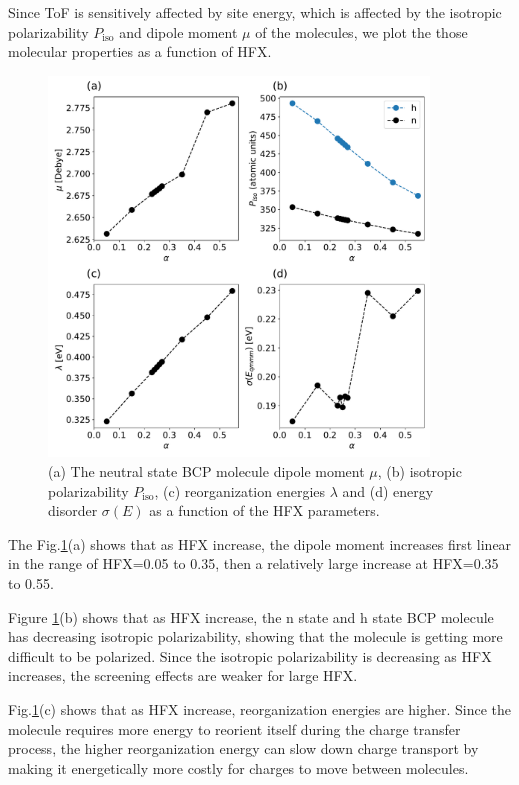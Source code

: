 \documentclass[letterpaper,12pt]{article}
\begin{document}
Since ToF is sensitively affected by site energy, which is affected by the isotropic polarizability $P_\text{iso}$ and dipole moment $\mu$ of the molecules, we plot the those molecular properties as a function of HFX. 
\begin{figure}[H]
    \centering
    \includegraphics[width=0.9\textwidth]{figs/BCP_HFX/fig_autogen_BCP.pdf}
    \caption{(a) The neutral state BCP molecule dipole moment $\mu$, (b) isotropic polarizability $P_\text{iso}$, (c) reorganization energies $\lambda$ and (d) energy disorder $\sigma(E)$ as a function of the HFX parameters. }
    \label{fig:autogen}
\end{figure}
The Fig.\ref{fig:autogen}(a) shows that as HFX increase, the dipole moment increases first linear in the range of HFX=0.05 to 0.35, then a relatively large increase at HFX=0.35 to 0.55.
 
Figure \ref{fig:autogen}(b) shows that as HFX increase, the n state and h state BCP molecule has decreasing isotropic polarizability, showing that the molecule is getting more difficult to be polarized. 
Since the isotropic polarizability is decreasing as HFX increases, the screening effects are weaker for large HFX. 

Fig.\ref{fig:autogen}(c) shows that as HFX increase, reorganization energies are higher. Since the molecule requires more energy to reorient itself during the charge transfer process, the higher reorganization energy can slow down charge transport by making it energetically more costly for charges to move between molecules.
\end{document}
